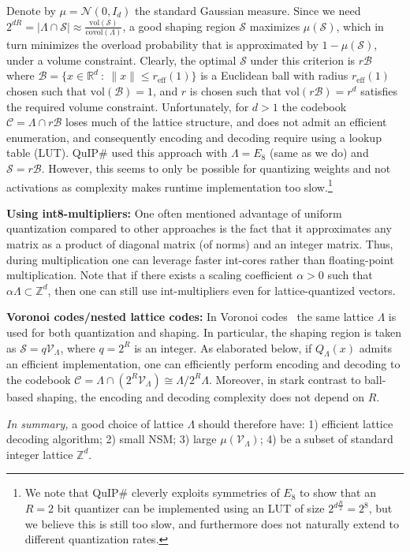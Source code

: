 \documentclass{article}
\newcommand{\RR}{\mathbb{R}}
\newcommand{\m}{\mathcal}
\def\calN{\mathcal{N}}
\newcommand{\Z}{\mathbb{Z}}
\theoremstyle{plain}
\theoremstyle{definition}
\theoremstyle{remark}
\begin{document}
Denote by $\mu=\calN(0,I_d)$ the standard Gaussian measure. Since we need $2^{dR}=|\Lambda\cap \m{S}|\approx \frac{\mathrm{vol}(\m{S})}{\mathrm{covol}(\Lambda)}$, a good shaping region $\m{S}$ maximizes $\mu(\m{S})$, which in turn minimizes the overload probability that is approximated by $1-\mu(\m{S})$, under a volume constraint. Clearly, the optimal $\m{S}$ under this criterion is $r\m{B}$ where $\m{B}=\{x\in\RR^d~:~\|x\|\leq r_{\text{eff}}(1)\}$ is a Euclidean ball with radius $r_{\text{eff}}(1)$ chosen such that $\mathrm{vol}(\m{B})=1$, and $r$ is chosen such that $\mathrm{vol}(r\m{B})=r^d$ satisfies the required volume constraint. Unfortunately, for $d>1$ the codebook $\m{C}=\Lambda\cap r\m{B}$ loses much of the lattice structure, and does not admit an efficient enumeration, and consequently encoding and decoding require using a lookup table (LUT). QuIP\# used this approach with $\Lambda = E_8$ (same as we do) and $\m{S} = r\m{B}$. However, this seems to only be possible for quantizing weights and not activations as complexity makes runtime implementation too slow.\footnote{We note that QuIP\# cleverly exploits symmetries of $E_8$ to show that an $R=2$ bit quantizer can be implemented using an LUT of size $2^{d\frac{R}{2}}=2^8$, but we believe this is still too slow, and furthermore does not naturally extend to different quantization rates.}

\textbf{Using int8-multipliers:} One often mentioned advantage of uniform quantization compared to other approaches is the fact that it approximates any matrix as a product of diagonal matrix (of norms) and an integer matrix. Thus, during multiplication one can leverage faster int-cores rather than floating-point multiplication. Note that if there exists a  scaling coefficient $\alpha>0$ such that $\alpha \Lambda \subset \mathbb{Z}^d$, then one can still use int-multipliers even for lattice-quantized vectors.

\textbf{Voronoi codes/nested lattice codes:} In Voronoi codes~\cite{ConwaySloane83} the same lattice $\Lambda$ is used for both quantization and shaping. In particular, the shaping region is taken as $\m{S}=q \m{V}_{\Lambda}$, where $q=2^R$ is an integer. As elaborated below, if $Q_{\Lambda}(x)$ admits an efficient implementation, one can efficiently perform encoding and decoding to the codebook $\m{C}=\Lambda\cap (2^R \m{V}_{\Lambda})\cong \Lambda/2^R\Lambda$. Moreover, in stark contrast to ball-based shaping, the encoding and decoding complexity does not depend on $R$.

\textit{In summary,} a good choice of lattice $\Lambda$ should therefore have: 1) efficient lattice decoding algorithm; 2) small NSM; 3) large $\mu(\m{V}_{\Lambda})$; 4) be a subset of standard integer lattice $\Z^d$.
\end{document}
